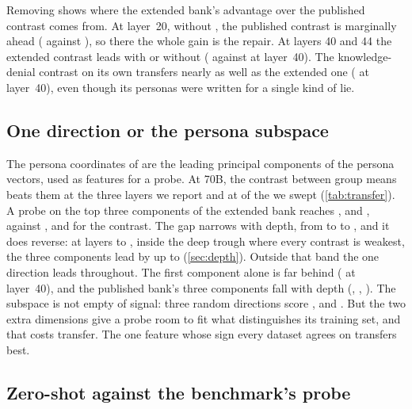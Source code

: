 Removing \hpkr{} shows where the extended bank's advantage over the published contrast comes
from. At layer~20, without \hpkr, the published contrast is marginally ahead (
against ), so there the whole gain is the \hpkr{} repair. At layers 40 and 44 the
extended contrast leads with or without \hpkr{} ( against  at
layer~40). The knowledge-denial contrast on its own transfers nearly as well as the extended one
( at layer~40), even though its personas were written for a single kind of lie.

\subsection{One direction or the persona subspace}
\label{sec:pcs}

The persona coordinates of \citet{mahadik2026persona} are the leading principal components of the
persona vectors, used as features for a probe. At 70B, the contrast between group means beats them
at the three layers we report and at  of the  we swept
(\cref{tab:transfer}). A probe on the top three components of the extended bank
reaches ,  and , against
,  and  for the contrast. The gap narrows with depth,
from  to  to , and it
does reverse: at layers  to , inside the deep trough
where every contrast is weakest, the three components lead by up to 
(\cref{sec:depth}). Outside that band the one direction leads throughout. The first component alone
is far behind ( at layer~40), and
the published bank's three components fall with depth (, ,
). The subspace is not empty of signal: three random directions score
,  and . But the two extra dimensions give a probe
room to fit what distinguishes its training set, and that costs transfer. The one feature whose
sign every dataset agrees on transfers best.

\subsection{Zero-shot against the benchmark's probe}
\label{sec:operating}

